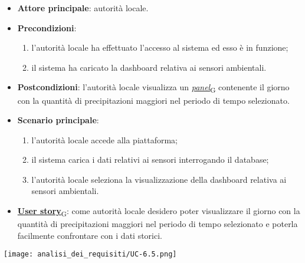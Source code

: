 \begin{itemize}
	\item \textbf{Attore principale}: autorità locale.
	\item \textbf{Precondizioni}:
	      \begin{enumerate}
		      \item l'autorità locale ha effettuato l'accesso al sistema ed esso è in funzione;
		      \item il sistema ha caricato la dashboard relativa ai sensori ambientali.
	      \end{enumerate}
	\item \textbf{Postcondizioni}: l'autorità locale visualizza un \href{https://7last.github.io/docs/pb/documentazione-interna/glossario\#panel}{\textit{panel}\textsubscript{G}} contenente il giorno con la quantità di precipitazioni maggiori nel periodo di tempo selezionato.
	\item \textbf{Scenario principale}:
	      \begin{enumerate}
		      \item l'autorità locale accede alla piattaforma;
		      \item il sistema carica i dati relativi ai sensori interrogando il database;
		      \item l'autorità locale seleziona la visualizzazione della dashboard relativa ai sensori ambientali.
	      \end{enumerate}
	\item \href{https://7last.github.io/docs/pb/documentazione-interna/glossario\#user-story}{\textbf{User story}\textsubscript{G}}:
	      come autorità locale desidero poter visualizzare il giorno con la quantità di precipitazioni maggiori nel periodo di tempo selezionato
	      e poterla facilmente confrontare con i dati storici.
\end{itemize}
\begin{center}
	\texttt{[image: analisi\_dei\_requisiti/UC-6.5.png]}
\end{center}


